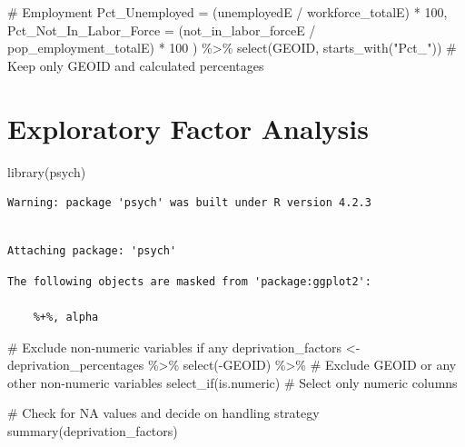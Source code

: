 \documentclass[
  letterpaper,
  DIV=11,
  numbers=noendperiod]{scrreprt}
\newenvironment{Shaded}{\begin{snugshade}}{\end{snugshade}}
\newcommand{\AttributeTok}[1]{\textcolor[rgb]{0.40,0.45,0.13}{#1}}
\newcommand{\CommentTok}[1]{\textcolor[rgb]{0.37,0.37,0.37}{#1}}
\newcommand{\DecValTok}[1]{\textcolor[rgb]{0.68,0.00,0.00}{#1}}
\newcommand{\FunctionTok}[1]{\textcolor[rgb]{0.28,0.35,0.67}{#1}}
\newcommand{\NormalTok}[1]{\textcolor[rgb]{0.00,0.23,0.31}{#1}}
\newcommand{\OtherTok}[1]{\textcolor[rgb]{0.00,0.23,0.31}{#1}}
\newcommand{\SpecialCharTok}[1]{\textcolor[rgb]{0.37,0.37,0.37}{#1}}
\newcommand{\StringTok}[1]{\textcolor[rgb]{0.13,0.47,0.30}{#1}}
\begin{document}
\begin{Shaded}
\begin{Highlighting}[]
    \CommentTok{\# Employment}
    \AttributeTok{Pct\_Unemployed =}\NormalTok{ (unemployedE }\SpecialCharTok{/}\NormalTok{ workforce\_totalE) }\SpecialCharTok{*} \DecValTok{100}\NormalTok{,}
    \AttributeTok{Pct\_Not\_In\_Labor\_Force =}\NormalTok{ (not\_in\_labor\_forceE }\SpecialCharTok{/}\NormalTok{ pop\_employment\_totalE) }\SpecialCharTok{*} \DecValTok{100}
\NormalTok{  ) }\SpecialCharTok{\%\textgreater{}\%}
  \FunctionTok{select}\NormalTok{(GEOID, }\FunctionTok{starts\_with}\NormalTok{(}\StringTok{"Pct\_"}\NormalTok{))  }\CommentTok{\# Keep only GEOID and calculated percentages}
\end{Highlighting}
\end{Shaded}


\chapter{Exploratory Factor Analysis}\label{exploratory-factor-analysis}

\begin{Shaded}
\begin{Highlighting}[]
\FunctionTok{library}\NormalTok{(psych)}
\end{Highlighting}
\end{Shaded}

\begin{verbatim}
Warning: package 'psych' was built under R version 4.2.3
\end{verbatim}

\begin{verbatim}

Attaching package: 'psych'
\end{verbatim}

\begin{verbatim}
The following objects are masked from 'package:ggplot2':

    %+%, alpha
\end{verbatim}

\begin{Shaded}
\begin{Highlighting}[]
\CommentTok{\# Exclude non{-}numeric variables if any}
\NormalTok{deprivation\_factors }\OtherTok{\textless{}{-}}\NormalTok{ deprivation\_percentages }\SpecialCharTok{\%\textgreater{}\%} 
  \FunctionTok{select}\NormalTok{(}\SpecialCharTok{{-}}\NormalTok{GEOID) }\SpecialCharTok{\%\textgreater{}\%}  \CommentTok{\# Exclude GEOID or any other non{-}numeric variables}
  \FunctionTok{select\_if}\NormalTok{(is.numeric)  }\CommentTok{\# Select only numeric columns}

\CommentTok{\# Check for NA values and decide on handling strategy}
\FunctionTok{summary}\NormalTok{(deprivation\_factors)}
\end{Highlighting}
\end{Shaded}
\end{document}
